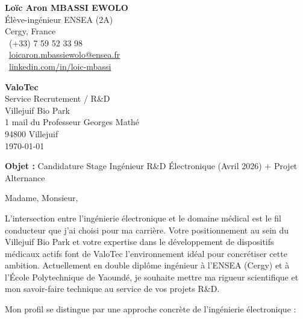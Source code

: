 \documentclass[11pt,a4paper]{letter}
\begin{document}
\begin{flushleft}
\textbf{Loïc Aron MBASSI EWOLO} \\
Élève-ingénieur ENSEA (2A) \\
Cergy, France \\
\faPhone\ (+33) 7 59 52 33 98 \\
\faEnvelope\ \href{mailto:loicaron.mbassiewolo@ensea.fr}{loicaron.mbassiewolo@ensea.fr} \\
\faLinkedin\ \href{https://www.linkedin.com/in/loic-mbassi}{linkedin.com/in/loic-mbassi}
\end{flushleft}

\vspace{0.3cm}

\begin{flushright}
\textbf{ValoTec} \\
Service Recrutement / R\&D \\
Villejuif Bio Park \\
1 mail du Professeur Georges Mathé \\
94800 Villejuif \\
\today
\end{flushright}

\vspace{0.3cm}

\noindent\textbf{Objet :} Candidature Stage Ingénieur R\&D Électronique (Avril 2026) + Projet Alternance

\vspace{0.4cm}

Madame, Monsieur,

\vspace{0.3cm}

L'intersection entre l'ingénierie électronique et le domaine médical est le fil conducteur que j'ai choisi pour ma carrière. Votre positionnement au sein du Villejuif Bio Park et votre expertise dans le développement de dispositifs médicaux actifs font de ValoTec l'environnement idéal pour concrétiser cette ambition. Actuellement en double diplôme ingénieur à l'ENSEA (Cergy) et à l'École Polytechnique de Yaoundé, je souhaite mettre ma rigueur scientifique et mon savoir-faire technique au service de vos projets R\&D.

\vspace{0.3cm}

Mon profil se distingue par une approche concrète de l'ingénierie électronique :
\end{document}
